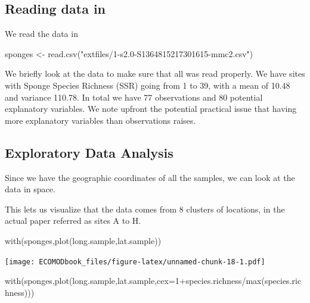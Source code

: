 \documentclass[
]{book}
\newenvironment{Shaded}{\begin{snugshade}}{\end{snugshade}}
\newcommand{\AttributeTok}[1]{\textcolor[rgb]{0.77,0.63,0.00}{#1}}
\newcommand{\DecValTok}[1]{\textcolor[rgb]{0.00,0.00,0.81}{#1}}
\newcommand{\FunctionTok}[1]{\textcolor[rgb]{0.00,0.00,0.00}{#1}}
\newcommand{\NormalTok}[1]{#1}
\newcommand{\OtherTok}[1]{\textcolor[rgb]{0.56,0.35,0.01}{#1}}
\newcommand{\SpecialCharTok}[1]{\textcolor[rgb]{0.00,0.00,0.00}{#1}}
\newcommand{\StringTok}[1]{\textcolor[rgb]{0.31,0.60,0.02}{#1}}
\begin{document}
\hypertarget{reading-data-in}{%
\subsection{Reading data in}\label{reading-data-in}}

We read the data in

\begin{Shaded}
\begin{Highlighting}[]
\NormalTok{sponges }\OtherTok{\textless{}{-}} \FunctionTok{read.csv}\NormalTok{(}\StringTok{"extfiles/1{-}s2.0{-}S1364815217301615{-}mmc2.csv"}\NormalTok{)}
\end{Highlighting}
\end{Shaded}

We briefly look at the data to make sure that all was read properly. We have sites with Sponge Species Richness (SSR) going from 1 to 39, with a mean of 10.48 and variance 110.78. In total we have 77 observations and 80 potential explanatory variables. We note upfront the potential practical issue that having more explanatory variables than observations raises.

\hypertarget{exploratory-data-analysis}{%
\subsection{Exploratory Data Analysis}\label{exploratory-data-analysis}}

Since we have the geographic coordinates of all the samples, we can look at the data in space.

This lets us visualize that the data comes from 8 clusters of locations, in the actual paper referred as sites A to H.

\begin{Shaded}
\begin{Highlighting}[]
\FunctionTok{with}\NormalTok{(sponges,}\FunctionTok{plot}\NormalTok{(long.sample,lat.sample)) }
\end{Highlighting}
\end{Shaded}

\texttt{[image: ECOMODbook\_files/figure-latex/unnamed-chunk-18-1.pdf]}

\begin{Shaded}
\begin{Highlighting}[]
\FunctionTok{with}\NormalTok{(sponges,}\FunctionTok{plot}\NormalTok{(long.sample,lat.sample,}\AttributeTok{cex=}\DecValTok{1}\SpecialCharTok{+}\NormalTok{species.richness}\SpecialCharTok{/}\FunctionTok{max}\NormalTok{(species.richness))) }
\end{Highlighting}
\end{Shaded}
\end{document}

